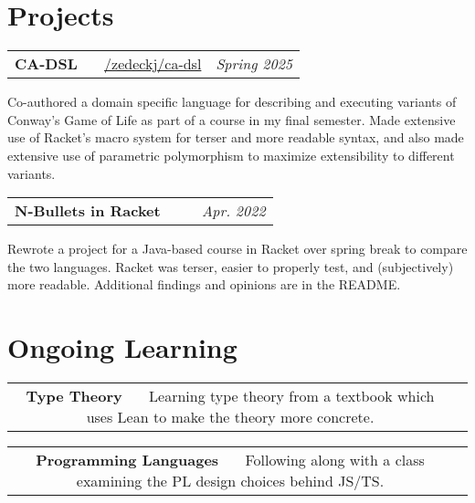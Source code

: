 \documentclass[letterpaper,11pt]{article}
\makeatletter
\newcommand{\resumeSubheading}[5]{
  \vspace{-1pt}\item
    \begin{tabular*}{0.97\textwidth}[t]{c@{\extracolsep{\fill}} r }
      \small\textbf{#1} \headingcap{#3} \ \ \ #2 &  \raggedleft\textit{\small #4} 
    \end{tabular*}
    \small#5
}
\makeatother
\begin{document}
  \section{Projects}
  \resumeSubheading{CA-DSL}{\href{https://github.com/zedeckj/ca-dsl}{\faIcon{github}/zedeckj/ca-dsl}}{Typed Racket}{Spring 2025}{Co-authored a domain specific language for describing and executing variants of Conway's Game of Life as part of a course in my final semester. Made extensive use of Racket's macro system for terser and more readable syntax, and also made extensive use of parametric polymorphism to maximize extensibility to different variants.}
  \resumeSubheading{N-Bullets in Racket}{\ghlink{nbulletsrkt}}{Intermediate Student Language (Racket)}{Apr.
  2022} {Rewrote a project for a Java-based course in Racket over spring break to compare the two
  languages. Racket was terser, easier to properly test, and (subjectively) more
  readable. Additional findings and opinions are in the README.}
  \section{Ongoing Learning}
  \resumeSubheading{Type Theory}{Learning type theory from a textbook which uses Lean to make the theory more concrete.}{\href{https://www.danielgratzer.com/papers/type-theory-book.pdf}{\faIcon{link}}}{}{}
  \resumeSubheading{Programming Languages}{Following along with a class examining the PL design choices behind JS/TS.}{\href{https://felleisen.org/matthias/4400-f25/index.html}{\faIcon{link}}}{}{}
\end{document}
